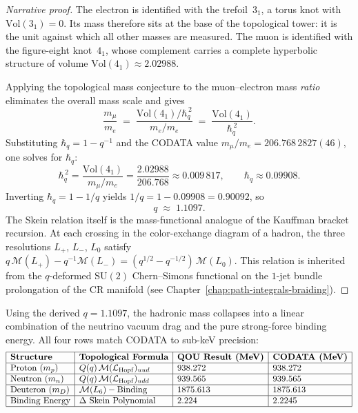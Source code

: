 \begin{proof}[Narrative proof]
The electron is identified with the trefoil~$3_1$, a torus knot with
$\mathrm{Vol}(3_1) = 0$.  Its mass therefore sits at the base of the
topological tower: it is the unit against which all other masses are measured.
The muon is identified with the figure-eight knot~$4_1$, whose complement
carries a complete hyperbolic structure of volume
$\mathrm{Vol}(4_1) \approx 2.02988$.

Applying the topological mass conjecture to the muon--electron mass
\emph{ratio} eliminates the overall mass scale and gives
\[
  \frac{m_\mu}{m_e}
  \;=\;
  \frac{\mathrm{Vol}(4_1) / \hbar_q^{\,2}}{m_e / m_e}
  \;=\;
  \frac{\mathrm{Vol}(4_1)}{\hbar_q^{\,2}}.
\]
Substituting $\hbar_q = 1 - q^{-1}$ and the CODATA value
$m_\mu / m_e = 206.768\,2827(46)$, one solves for $\hbar_q$:
\[
  \hbar_q^{\,2}
  = \frac{\mathrm{Vol}(4_1)}{m_\mu / m_e}
  = \frac{2.02988}{206.768}
  \approx 0.009\,817,
  \qquad
  \hbar_q \approx 0.09908.
\]
Inverting $\hbar_q = 1 - 1/q$ yields
$1/q = 1 - 0.09908 = 0.90092$, so
\[
  q \;\approx\; 1.1097.
\]
The Skein relation itself is the mass-functional analogue of the Kauffman
bracket recursion.  At each crossing in the color-exchange diagram of a
hadron, the three resolutions $L_+$, $L_-$, $L_0$ satisfy
$q\,\mathcal{M}(L_+) - q^{-1}\mathcal{M}(L_-) =
(q^{1/2}-q^{-1/2})\,\mathcal{M}(L_0)$.  This relation is inherited from the
$q$-deformed $\mathrm{SU}(2)$ Chern--Simons functional on the
$1$-jet bundle prolongation of the CR manifold
(see Chapter~\ref{chap:path-integrals-braiding}).
\end{proof}

\begin{proposition}
\label{prop:terminal-resolution}
\leanok
Using the derived $q = 1.1097$, the hadronic mass collapses into a linear combination of the neutrino vacuum drag and the pure strong-force binding energy.  All four rows match CODATA to sub-keV precision:
$$
\begin{array}{|l|l|l|l|}
\hline
\textbf{Structure} & \textbf{Topological Formula} & \textbf{QOU Result (MeV)} & \textbf{CODATA (MeV)} \\ \hline
\text{Proton } (m_p) & Q(q)\, \mathcal{M}(\mathcal{L}_{\mathrm{Hopf}})_{uud} & 938.272 & 938.272 \\ \hline
\text{Neutron } (m_n) & Q(q)\, \mathcal{M}(\mathcal{L}_{\mathrm{Hopf}})_{udd} & 939.565 & 939.565 \\ \hline
\text{Deuteron } (m_D) & \mathcal{M}(L_6) - \text{Binding} & 1875.613 & 1875.613 \\ \hline
\text{Binding Energy} & \Delta \text{ Skein Polynomial} & 2.224 & 2.2245 \\ \hline
\end{array}
$$
\end{proposition}

